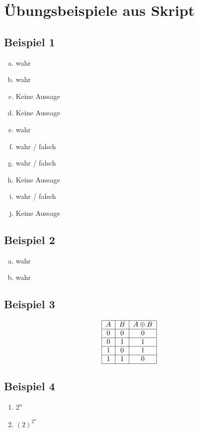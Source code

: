 \documentclass[12pt, a4paper, oneside]{article}
\begin{document}
\newpage 
\section{Übungsbeispiele aus Skript} 
\subsection{Beispiel 1}
\begin{enumerate}[(a)]
  \item wahr
  \item wahr
  \item Keine Aussage
  \item Keine Aussage
  \item wahr
  \item wahr / falsch
  \item wahr / falsch
  \item Keine Aussage
  \item wahr / falsch
  \item Keine Aussage
\end{enumerate}

\subsection{Beispiel 2}
\begin{enumerate}[(a)]
  \item wahr
  \item wahr
\end{enumerate}

\subsection{Beispiel 3}
\begin{equation}
  \begin{tabular}{| c | c | c |}
    \hline
    $A$ & $B$ & $A \oplus B$ \\ \hline
    0 & 0 & 0 \\ \hline
    0 & 1 & 1 \\ \hline
    1 & 0 & 1 \\ \hline
    1 & 1 & 0 \\ \hline
  \end{tabular}
\end{equation}

\subsection{Beispiel 4}
\begin{enumerate}
  \item $2^{n}$
  \item $(2)^{2^{n}}$
\end{enumerate}
\end{document}
